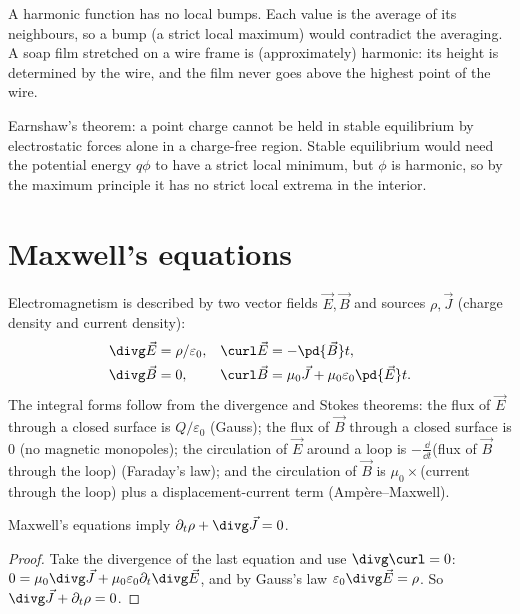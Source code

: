 \begin{intuition}
A harmonic function has no local bumps. Each value is the average of its neighbours, so a bump (a strict local maximum) would contradict the averaging. A soap film stretched on a wire frame is (approximately) harmonic: its height is determined by the wire, and the film never goes above the highest point of the wire.
\end{intuition}

\begin{example}
Earnshaw's theorem: a point charge cannot be held in stable equilibrium by electrostatic forces alone in a charge-free region. Stable equilibrium would need the potential energy $q\phi$ to have a strict local minimum, but $\phi$ is harmonic, so by the maximum principle it has no strict local extrema in the interior.
\end{example}

\section{Maxwell's equations}

Electromagnetism is described by two vector fields $\vec E,\vec B$ and sources $\rho,\vec J$ (charge density and current density):
\begin{align*}
\divg\vec E&=\rho/\varepsilon_0, & \curl\vec E&=-\pd{\vec B}t,\\
\divg\vec B&=0, & \curl\vec B&=\mu_0\vec J+\mu_0\varepsilon_0\pd{\vec E}t .
\end{align*}
The integral forms follow from the divergence and Stokes theorems: the flux of $\vec E$ through a closed surface is $Q/\varepsilon_0$ (Gauss); the flux of $\vec B$ through a closed surface is $0$ (no magnetic monopoles); the circulation of $\vec E$ around a loop is $-\frac{\dd}{\dd t}$(flux of $\vec B$ through the loop) (Faraday's law); and the circulation of $\vec B$ is $\mu_0\times$(current through the loop) plus a displacement-current term (Amp\`ere--Maxwell).

\begin{theorem}\label{thm:chargecons}
Maxwell's equations imply $\partial_t\rho+\divg\vec J=0$.
\end{theorem}

\begin{proof}
Take the divergence of the last equation and use $\divg\curl=0$: $0=\mu_0\divg\vec J+\mu_0\varepsilon_0\partial_t\divg\vec E$, and by Gauss's law $\varepsilon_0\divg\vec E=\rho$. So $\divg\vec J+\partial_t\rho=0$.
\end{proof}

